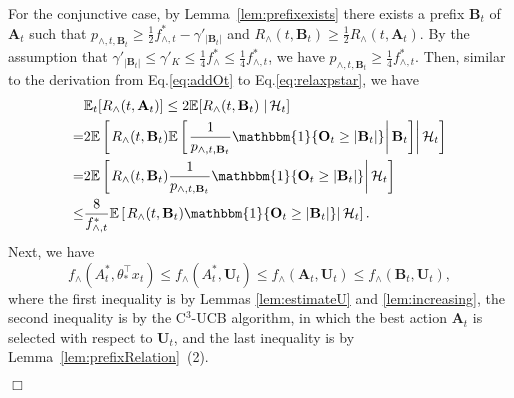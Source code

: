 \documentclass{article}
\newcommand{\bbeta}{\boldsymbol{\beta}}
\newcommand{\EE}{\mathbb{E}}
\newcommand{\bOne}{\mathbbm{1}}
\newcommand{\bA}{\mathbf{A}}
\newcommand{\bB}{\mathbf{B}}
\newcommand{\bO}{\mathbf{O}}
\newcommand{\bU}{\mathbf{U}}
\newcommand{\bV}{\mathbf{V}}
\newcommand{\cH}{\mathcal{H}}
\newcommand{\abs}[1]{\left| #1 \right|}
\newcommand{\norm}[1]{\| #1 \|}
\newenvironment{proof}{\noindent {\textbf{Proof. }}}{$\Box$ \medskip}
\begin{document}
\begin{proof}
For the conjunctive case, by Lemma~\ref{lem:prefixexists} there exists a prefix $\bB_t$ of $\bA_t$ such that $p_{\wedge, t, \bB_t} \geq \frac{1}{2}f_{\wedge, t}^* - \gamma'_{|\bB_t|}$ and $R_{\wedge}(t, \bB_t) \geq \frac{1}{2} R_{\wedge}(t, \bA_t)$. 
By the assumption that $\gamma'_{|\bB_t|}\le \gamma'_K \le \frac{1}{4} f^*_{\wedge}
	\le \frac{1}{4} f^*_{\wedge,t}  $, we have
	$p_{\wedge, t, \bB_t} \geq \frac{1}{4}f_{\wedge, t}^*$.
Then, similar to the derivation from Eq.\eqref{eq:addOt} to Eq.\eqref{eq:relaxpstar},
	we have
\begin{align}
&\EE_t[R_{\wedge}(t, \bA_t)] \leq 2 \EE[R_{\wedge}(t, \bB_t) \left. \right| \cH_t] \nonumber \\
=& 2 \EE \left[ \left. R_{\wedge}(t, \bB_t) \EE \left[ \left. \frac{1}{p_{\wedge, t, \bB_t}} \bOne\{\bO_t\geq\abs{\bB_t}\} \right| \bB_t \right]  \right| \cH_t \right] \nonumber \\
=& 2\EE \left[ \left. R_{\wedge}(t, \bB_t) \frac{1}{p_{\wedge, t, \bB_t}} \bOne\{\bO_t\geq\abs{\bB_t}\}  \right| \cH_t \right] \nonumber \\
\leq &\frac{8}{f_{\wedge, t}^{\ast}} \EE \left[ \left. R_{\wedge}(t, \bB_t) \bOne\{\bO_t\geq\abs{\bB_t}\}  \right| \cH_t \right]. \label{eq:btOneotbt}
\end{align}
Next, we have
\begin{equation} \label{eq:andstarbt}
f_{\wedge}(A_t^*, \theta_*^{\top}x_t) \leq f_{\wedge}(A_t^*,\bU_t) \leq f_{\wedge}(\bA_t,\bU_t) \leq f_{\wedge}(\bB_t,\bU_t),
\end{equation}
where the first inequality is by Lemmas \ref{lem:estimateU} and \ref{lem:increasing},
	the second inequality is by the C$^3$-UCB algorithm, in which the best action $\bA_t$ is selected
	with respect to $\bU_t$, and the last inequality is by
	Lemma~\ref{lem:prefixRelation}~(2).


\end{proof}
\end{document}
